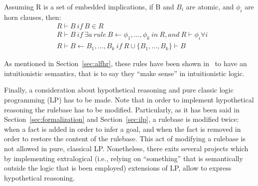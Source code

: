 Assuming R is a set of embedded implications, if B and $B_i$ are atomic, and $\phi_i$
are horn clauses, then:
\begin{equation}
  \begin{split}
    &R \vdash B\ if\ B \in R \\
    &R \vdash B\ if\ \exists a\ rule\ B \leftarrow \phi_1,...,\phi_k\ in\ R, and\ R \vdash \phi_i \forall i\\
    &R \vdash B \leftarrow B_1,..., B_k\ if\ R \cup \{B_1,...,B_k\} \vdash B
  \end{split}
\end{equation}


As mentioned in Section~\ref{sec:alfhr}, these rules have been shown in~\cite{Bonner88alogic}
to have an intuitionistic semantics, that is to say they ``make sense'' in intuitionistic logic.

Finally, a consideration about hypothetical reasoning and pure classic logic programming
(LP) has to be made. Note that in order to implement hypothetical reasoning the rulebase
has to be modified. Particularly, as it has been said in Section~\ref{sec:formalization} and Section~\ref{sec:ilp},
a rulebase is modified twice: when a fact is added
in order to infer a goal, and when the fact is removed in order to restore the content of the rulebase.
This act of modifying a rulebase is not allowed in pure, classical LP. Nonetheless, there exits
several projects which by implementing extralogical (i.e., relying on ``something'' that
is semantically outside the logic that is been employed)
extensions of LP, allow to express hypothetical reasoning.
